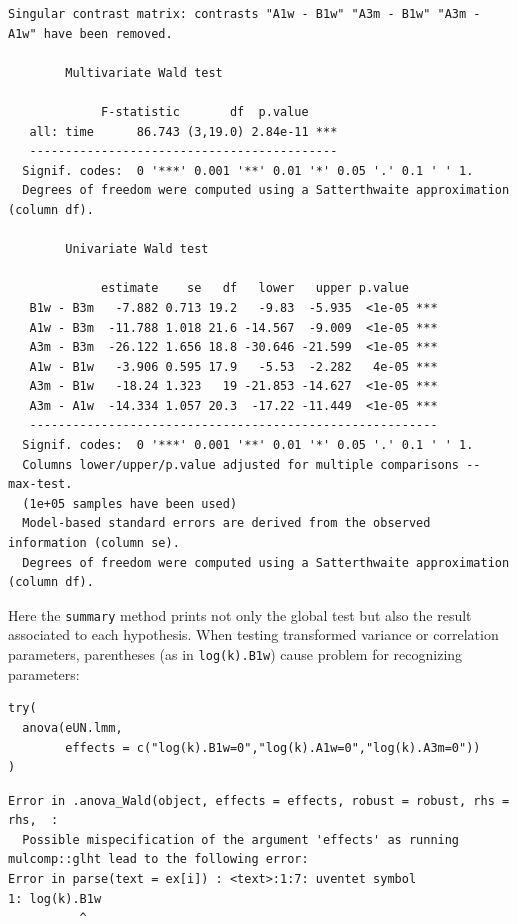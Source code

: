 \documentclass[12pt]{article}
\begin{document}
\begin{verbatim}
Singular contrast matrix: contrasts "A1w - B1w" "A3m - B1w" "A3m - A1w" have been removed. 

		Multivariate Wald test 

             F-statistic       df  p.value    
   all: time      86.743 (3,19.0) 2.84e-11 ***
   ------------------------------------------- 
  Signif. codes:  0 '***' 0.001 '**' 0.01 '*' 0.05 '.' 0.1 ' ' 1.
  Degrees of freedom were computed using a Satterthwaite approximation (column df). 

		Univariate Wald test 

             estimate    se   df   lower   upper p.value    
   B1w - B3m   -7.882 0.713 19.2   -9.83  -5.935  <1e-05 ***
   A1w - B3m  -11.788 1.018 21.6 -14.567  -9.009  <1e-05 ***
   A3m - B3m  -26.122 1.656 18.8 -30.646 -21.599  <1e-05 ***
   A1w - B1w   -3.906 0.595 17.9   -5.53  -2.282   4e-05 ***
   A3m - B1w   -18.24 1.323   19 -21.853 -14.627  <1e-05 ***
   A3m - A1w  -14.334 1.057 20.3  -17.22 -11.449  <1e-05 ***
   --------------------------------------------------------- 
  Signif. codes:  0 '***' 0.001 '**' 0.01 '*' 0.05 '.' 0.1 ' ' 1.
  Columns lower/upper/p.value adjusted for multiple comparisons -- max-test.
  (1e+05 samples have been used)
  Model-based standard errors are derived from the observed information (column se). 
  Degrees of freedom were computed using a Satterthwaite approximation (column df).
\end{verbatim}

Here the \texttt{summary} method prints not only the global test but also the
result associated to each hypothesis. When testing transformed
variance or correlation parameters, parentheses (as in \texttt{log(k).B1w})
cause problem for recognizing parameters:
\lstset{language=r,label= ,caption= ,captionpos=b,numbers=none}
\begin{lstlisting}
try(
  anova(eUN.lmm,
        effects = c("log(k).B1w=0","log(k).A1w=0","log(k).A3m=0"))
)
\end{lstlisting}

\begin{verbatim}
Error in .anova_Wald(object, effects = effects, robust = robust, rhs = rhs,  : 
  Possible mispecification of the argument 'effects' as running mulcomp::glht lead to the following error: 
Error in parse(text = ex[i]) : <text>:1:7: uventet symbol
1: log(k).B1w
          ^
\end{verbatim}


\clearpage
\end{document}
